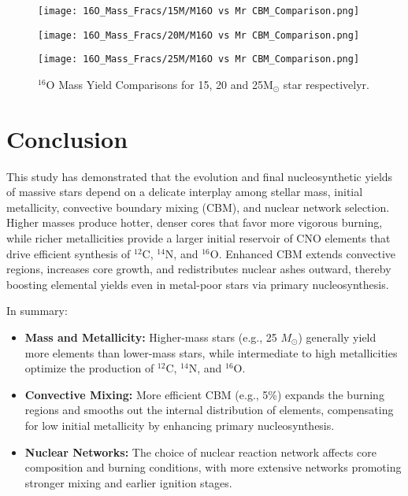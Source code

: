 \begin{figure}
   \centering
   \begin{minipage}{0.7\textwidth}
      \centering
      \texttt{[image: 16O\_Mass\_Fracs/15M/M16O vs Mr CBM\_Comparison.png]}
      \label{fig:16O_15M_VCBM}
   \end{minipage}

   \vspace{-1em}
   \begin{minipage}{0.7\textwidth}
      \centering
      \texttt{[image: 16O\_Mass\_Fracs/20M/M16O vs Mr CBM\_Comparison.png]}
      \label{fig:16O_20M_VCBM}
   \end{minipage}

   \vspace{-1em}
   \begin{minipage}{0.7\textwidth}
      \centering
      \texttt{[image: 16O\_Mass\_Fracs/25M/M16O vs Mr CBM\_Comparison.png]}
      \label{fig:16O_25M_VCBM}
   \end{minipage}
   
   \vspace{-1em}
   \caption{  \(^{16}\)O Mass Yield Comparisons for 15, 20 and 25M\(_\odot\) star respectivelyr.}
   \label{fig:25M_yield_comparison}
\end{figure}

\clearpage
\section{Conclusion}

This study has demonstrated that the evolution and final nucleosynthetic yields of massive stars depend on a delicate interplay among stellar mass, initial metallicity, convective boundary mixing (CBM), and nuclear network selection. Higher masses produce hotter, denser cores that favor more vigorous burning, while richer metallicities provide a larger initial reservoir of CNO elements that drive efficient synthesis of $^{12}$C, $^{14}$N, and $^{16}$O. Enhanced CBM extends convective regions, increases core growth, and redistributes nuclear ashes outward, thereby boosting elemental yields even in metal-poor stars via primary nucleosynthesis.

In summary:
\begin{itemize}
    \item \textbf{Mass and Metallicity:} Higher-mass stars (e.g., 25 $M_\odot$) generally yield more elements than lower-mass stars, while intermediate to high metallicities optimize the production of $^{12}$C, $^{14}$N, and $^{16}$O.
    \item \textbf{Convective Mixing:} More efficient CBM (e.g., 5\%) expands the burning regions and smooths out the internal distribution of elements, compensating for low initial metallicity by enhancing primary nucleosynthesis.
    \item \textbf{Nuclear Networks:} The choice of nuclear reaction network affects core composition and burning conditions, with more extensive networks promoting stronger mixing and earlier ignition stages.
\end{itemize}

